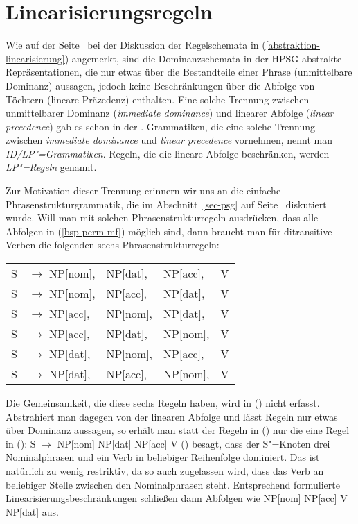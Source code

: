 \section{Linearisierungsregeln}

Wie auf der Seite~\pageref{abstraktion-linearisierung} bei der Diskussion der Regelschemata in
(\ref{abstraktion-linearisierung}) angemerkt, sind die Dominanzschemata in der HPSG abstrakte
Repräsentationen, die nur etwas über die Bestandteile einer Phrase (unmittelbare Dominanz)
aussagen, jedoch keine Beschränkungen über die Abfolge von Töchtern (lineare Präzedenz)
enthalten. Eine solche Trennung zwischen unmittelbarer Dominanz (\emph{immediate dominance})
und linearer Abfolge (\emph{linear precedence}) gab es schon in der \gpsg
\citep*{GKPS85a}. Grammatiken, die eine solche Trennung zwischen \emph{immediate dominance} und
\emph{linear precedence} vornehmen, nennt man \emph{ID/LP"=Grammatiken}. Regeln, die die lineare Abfolge
beschränken, werden \emph{LP"=Regeln} genannt.

Zur Motivation dieser Trennung erinnern wir uns an die einfache Phrasenstrukturgrammatik,
die im Abschnitt~\ref{sec-psg} auf Seite~\pageref{ditrans-ps-regeln} diskutiert wurde. Will man
mit solchen Phrasenstrukturregeln ausdrücken, dass alle Abfolgen in (\ref{bsp-perm-mf}) möglich sind,
dann braucht man für ditransitive Verben die folgenden sechs Phrasenstrukturregeln:
\ea
\begin{tabular}[t]{@{}l@{ }l@{ }l@{ }l@{ }l}
S  & $\to$ NP[nom],& NP[dat], & NP[acc], & V\\
S  & $\to$ NP[nom],& NP[acc], & NP[dat], & V\\
S  & $\to$ NP[acc],& NP[nom], & NP[dat], & V\\
S  & $\to$ NP[acc],& NP[dat], & NP[nom], & V\\
S  & $\to$ NP[dat],& NP[nom], & NP[acc], & V\\
S  & $\to$ NP[dat],& NP[acc], & NP[nom], & V\\
\end{tabular}
\z
Die Gemeinsamkeit, die diese sechs Regeln haben, wird in () nicht erfasst. Abstrahiert man
dagegen von der linearen Abfolge und lässt Regeln nur etwas über Dominanz aussagen, so erhält man
statt der Regeln in () nur die eine Regel in ():
 \ea
S $\to$ NP[nom] NP[dat] NP[acc] V
\z
() besagt, dass der S"=Knoten drei Nominalphrasen und ein Verb in beliebiger Reihenfolge
dominiert. Das ist natürlich zu wenig restriktiv, da so auch zugelassen wird, dass das Verb an beliebiger
Stelle zwischen den Nominalphrasen steht. Entsprechend formulierte Linearisierungsbeschränkungen
schließen dann Abfolgen wie NP[nom] NP[acc] V NP[dat] aus.

